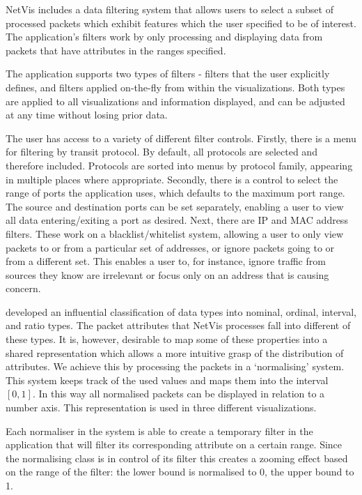 NetVis includes a data filtering system that allows users to select a subset of processed packets which exhibit features which the user specified to be of interest. The application's filters work by only processing and displaying data from packets that have attributes in the ranges specified.

The application supports two types of filters - filters that the user explicitly defines, and filters applied on-the-fly from within the visualizations.
Both types are applied to all visualizations and information displayed, and can be adjusted at any time without losing prior data.

The user has access to a variety of different filter controls.  Firstly, there is a menu for filtering by transit protocol. By default, all protocols are selected and therefore included. Protocols are sorted into menus by protocol family, appearing in multiple places where appropriate. Secondly, there is a control to select the range of ports the application uses, which defaults to the maximum port range.  The source and destination ports can be set separately, enabling a user to view all data entering/exiting a port as desired.  Next, there are IP and MAC address filters.  These work on a blacklist/whitelist system, allowing a user to only view packets to or from a particular set of addresses, or ignore packets going to or from a different set.  This enables a user to, for instance, ignore traffic from sources they know are irrelevant or focus only on an address that is causing concern.

\cite{stevens1946theory} developed an influential classification of data types into nominal, ordinal, interval, and ratio types. The packet attributes that NetVis processes fall into different of these types. It is, however, desirable to map some of these properties into a shared representation which allows a more intuitive grasp of the distribution of attributes. We achieve this by processing the packets in a `normalising' system. This system keeps track of the used values and maps them into the interval $[0,1]$. In this way all normalised packets can be displayed in relation to a number axis. This representation is used in three different visualizations.

Each normaliser in the system is able to create a temporary filter in the application that will filter its corresponding attribute on a certain range.
Since the normalising class is in control of its filter this creates a zooming effect based on the range of the filter: the lower bound is normalised to 0, the upper bound to 1. 


